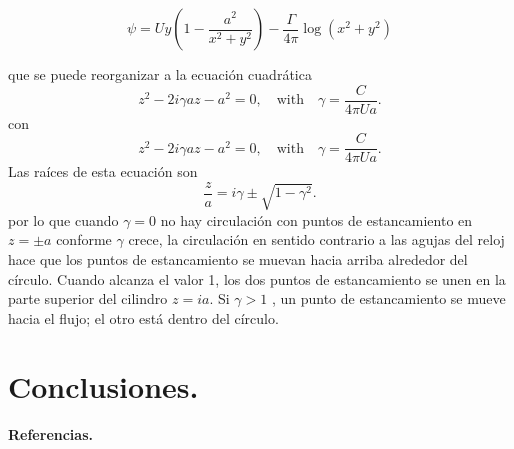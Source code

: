 \documentclass[12pt]{article}
\begin{document}
			\begin{equation}
				\psi = U y \left( 1 - \frac{a^2}{x^2+y^2} \right) - \frac{\Gamma}{4\pi} \log\left(x^2+y^2\right)
			\end{equation}

			

			que se puede reorganizar a la ecuación cuadrática
			\begin{equation}
				z^2-2i\gamma a z - a^2 = 0, \quad \text{with}\quad \gamma =\frac{C}{4\pi Ua}.
			\end{equation}
			con 
			\begin{equation}
				z^2-2i\gamma a z - a^2 = 0, \quad \text{with}\quad \gamma =\frac{C}{4\pi Ua}.
			\end{equation}
			Las raíces de esta ecuación son
			\begin{equation}
				\frac{z}{a} = i\gamma \pm \sqrt{1-\gamma^2}.
			\end{equation}
			por lo que cuando $\gamma = 0$ no hay circulación con puntos de estancamiento en $z =\pm a$ conforme $\gamma$ crece, la circulación en sentido contrario a las agujas del reloj hace que los puntos de estancamiento se muevan hacia arriba alrededor del círculo. Cuando alcanza el valor 1, los dos puntos de estancamiento se unen en la parte superior del cilindro $z = ia$. Si $\gamma > 1$ , un punto de estancamiento se mueve hacia el flujo; el otro está dentro del círculo.



		

\newpage
\section*{Conclusiones.}

\newpage
\begin{center}
    \textbf{\Large Referencias.}
    \end{center}
\end{document}
